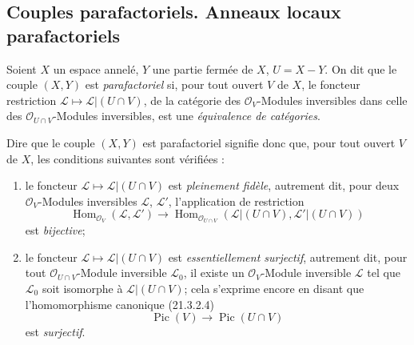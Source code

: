 \subsection{Couples parafactoriels. Anneaux locaux parafactoriels}
\label{subsection:IV.21.13}
\label{IV.21.13}

\begin{definition}[21.13.1]
\label{IV.21.13.1}
Soient $X$ un espace annelé, $Y$ une partie fermée de $X$, $U=X-Y$.
On dit que le couple $(X,Y)$ est \emph{parafactoriel} si, pour tout ouvert $V$ de $X$,
le foncteur restriction
$\mathscr L\mapsto\mathscr L|(U\cap V)$, de la catégorie des
$\mathcal O_V$-Modules inversibles dans celle des $\mathcal O_{U\cap V}$-Modules
inversibles, est une \emph{équivalence de catégories}.
\end{definition}

Dire que le couple $(X,Y)$ est parafactoriel signifie donc que, pour tout ouvert $V$
de $X$, les conditions suivantes sont vérifiées :
\begin{enumerate}[label=\arabic*\textsuperscript{o}]
  \item le foncteur $\mathscr L\mapsto\mathscr L|(U\cap V)$ est \emph{pleinement
  fidèle}, autrement dit, pour deux $\mathcal O_V$-Modules inversibles $\mathscr L$,
  $\mathscr L'$, l'application de restriction
  \[
    \operatorname{Hom}_{\mathcal O_V}(\mathscr L,\mathscr L')
    \longrightarrow
    \operatorname{Hom}_{\mathcal O_{U\cap V}}
    (\mathscr L|(U\cap V),\mathscr L'|(U\cap V))
  \]
  est \emph{bijective};
  \item le foncteur $\mathscr L\mapsto\mathscr L|(U\cap V)$ est
  \emph{essentiellement surjectif}, autrement dit, pour tout
  $\mathcal O_{U\cap V}$-Module inversible $\mathscr L_0$, il existe un
  $\mathcal O_V$-Module inversible $\mathscr L$ tel que $\mathscr L_0$ soit
  isomorphe à $\mathscr L|(U\cap V)$; cela s'exprime encore en disant que
  l'homomorphisme canonique (21.3.2.4)
  \[
    \operatorname{Pic}(V)\longrightarrow\operatorname{Pic}(U\cap V)
  \]
  est \emph{surjectif}.
\end{enumerate}

